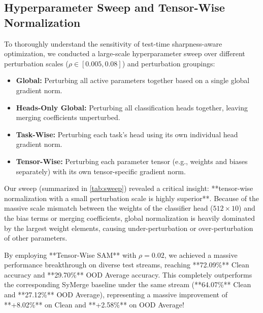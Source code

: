 \documentclass{article}
\begin{document}
\subsection{Hyperparameter Sweep and Tensor-Wise Normalization}
To thoroughly understand the sensitivity of test-time sharpness-aware optimization, we conducted a large-scale hyperparameter sweep over different perturbation scales ($\rho \in [0.005, 0.08]$) and perturbation groupings:
\begin{itemize}
    \item \textbf{Global:} Perturbing all active parameters together based on a single global gradient norm.
    \item \textbf{Heads-Only Global:} Perturbing all classification heads together, leaving merging coefficients unperturbed.
    \item \textbf{Task-Wise:} Perturbing each task's head using its own individual head gradient norm.
    \item \textbf{Tensor-Wise:} Perturbing each parameter tensor (e.g., weights and biases separately) with its own tensor-specific gradient norm.
\end{itemize}

Our sweep (summarized in \cref{tab:sweep}) revealed a critical insight: **tensor-wise normalization with a small perturbation scale is highly superior**. Because of the massive scale mismatch between the weights of the classifier head ($512 \times 10$) and the bias terms or merging coefficients, global normalization is heavily dominated by the largest weight elements, causing under-perturbation or over-perturbation of other parameters. 

By employing **Tensor-Wise SAM** with $\rho = 0.02$, we achieved a massive performance breakthrough on diverse test streams, reaching **72.09\%** Clean accuracy and **29.70\%** OOD Average accuracy. This completely outperforms the corresponding SyMerge baseline under the same stream (**64.07\%** Clean and **27.12\%** OOD Average), representing a massive improvement of **+8.02\%** on Clean and **+2.58\%** on OOD Average!
\end{document}
